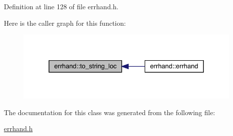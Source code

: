 Definition at line 128 of file errhand.\+h.

Here is the caller graph for this function\+:\nopagebreak
\begin{figure}[H]
\begin{center}
\leavevmode
\includegraphics[width=319pt]{classerrhand_a930df1c197154853159683cb2ad55369_icgraph}
\end{center}
\end{figure}


The documentation for this class was generated from the following file\+:\begin{DoxyCompactItemize}
\item 
\mbox{\hyperlink{errhand_8h}{errhand.\+h}}\end{DoxyCompactItemize}
